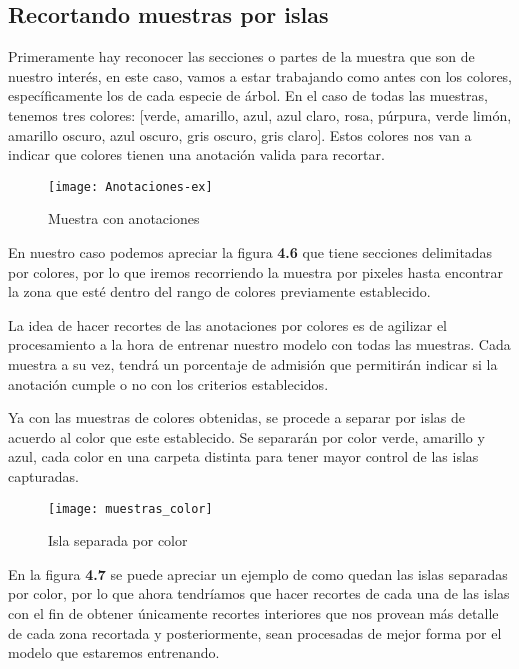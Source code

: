 \subsection{Recortando muestras por islas}
Primeramente hay reconocer las secciones o partes de la muestra que son de nuestro interés, en este caso, vamos a estar trabajando como antes con los colores, específicamente los de cada especie de árbol. En el caso de todas las muestras, tenemos tres colores: [verde, amarillo, azul, azul claro, rosa, púrpura, verde limón, amarillo oscuro, azul oscuro, gris oscuro, gris claro]. Estos colores nos van a indicar que colores tienen una anotación valida para recortar.


\begin{figure}[H]
  \centering
  \begin{minipage}[b]{0.5\textwidth}
        \texttt{[image: Anotaciones-ex]}
    \caption{Muestra con anotaciones}
  \end{minipage}
\end{figure}

En nuestro caso podemos apreciar la figura \textbf{4.6} que tiene secciones delimitadas por colores, por lo que iremos recorriendo la muestra por pixeles hasta encontrar la zona que esté dentro del rango de colores previamente establecido.

La idea de hacer recortes de las anotaciones por colores es de agilizar el procesamiento a la hora de entrenar nuestro modelo con todas las muestras. Cada muestra a su vez, tendrá un porcentaje de admisión que permitirán indicar si la anotación cumple o no con los criterios establecidos.

Ya con las muestras de colores obtenidas, se procede a separar por islas de acuerdo al color que este establecido. Se separarán por color verde, amarillo y azul, cada color en una carpeta distinta para tener mayor control de las islas capturadas.

\begin{figure}[H]
  \centering
  \begin{minipage}[b]{0.5\textwidth}
        \texttt{[image: muestras\_color]}
    \caption{Isla separada por color}
  \end{minipage}
\end{figure}

En la figura \textbf{4.7} se puede apreciar un ejemplo de como quedan las islas separadas por color, por lo que ahora tendríamos que hacer recortes de cada una de las islas con el fin de obtener únicamente recortes interiores que nos provean más detalle de cada zona recortada y posteriormente, sean procesadas de mejor forma por el modelo que estaremos entrenando. \\

